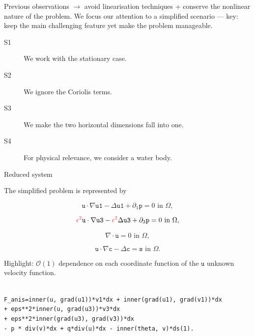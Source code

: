 \documentclass{beamer}
\begin{document}
\begin{frame}
Previous observations $\to$ \textcolor{mediumred-violet}{avoid linearisation techniques} + conserve the nonlinear nature of the problem. We focus our attention to a simplified scenario --- key: keep the main challenging feature yet make the problem manageable.

\begin{description}
\item[S1] We work with the stationary case.
\item[S2] We ignore the Coriolis terms.
\item[S3] We make the two horizontal dimensions fall into one.
\item[S4] For physical relevance, we consider a water body.
\end{description}

\end{frame}

\begin{frame}{Reduced system}

The simplified problem is represented by

\begin{equation} \nonumber
  \mathbf{\texttt{u}} \cdot \nabla \texttt{u1} - \Delta \texttt{u1} + \partial_1 \texttt{p} = 0 \text{ in } \Omega,
\end{equation}
    
\begin{equation} \nonumber
  \textcolor{jasper}{\epsilon^2} \mathbf{\texttt{u}} \cdot \nabla \texttt{u3} - \textcolor{jasper}{\epsilon^2} \Delta \texttt{u3} + \partial_3 \texttt{p}  = 0 \text{ in } \Omega,
\end{equation}
    
\begin{equation} \nonumber
  \nabla \cdot \mathbf{\texttt{u}} = 0 \text{ in } \Omega,
\end{equation}

\begin{equation} \nonumber
  \texttt{u} \cdot \nabla \texttt{c} - \Delta \texttt{c} = \texttt{s} \text{ in } \Omega.
\end{equation}

\end{frame}

\begin{frame}

Highlight: $\mathcal{O}(1)$ dependence on each coordinate function of the $\texttt{u}$ unknown velocity function.

\texttt{
\\
F\_anis=inner(u, grad(u1))*v1*dx + inner(grad(u1), grad(v1))*dx \\
+ \textcolor{jasper}{eps**2}*inner(u, grad(u3))*v3*dx \\
+ \textcolor{jasper}{eps**2}*inner(grad(u3), grad(v3))*dx \\
 - p * div(v)*dx + q*div(u)*dx - inner(theta, v)*ds(1). \\
}

\end{frame}
\end{document}
